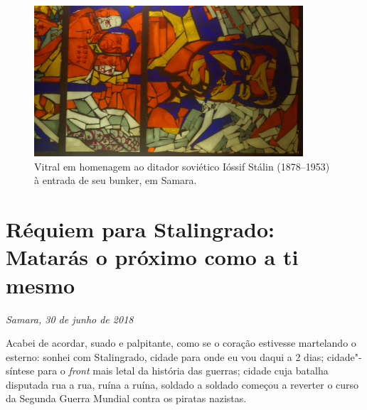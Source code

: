 \movetoevenpage
\begin{absolutelynopagebreak}
\begin{vplace}
\begin{figure}[H]
\begin{adjustwidth}{-2.7cm}{}
  \vspace{-2.5cm}
  \hspace{2.2cm}
  \includegraphics[width=100mm]{./imgs/samara1.jpg}  
\end{adjustwidth}
  \caption{Vitral em homenagem ao ditador soviético Ióssif Stálin (1878--1953) à entrada de seu bunker, em Samara.}

\thispagestyle{empty}

\end{figure}
\end{vplace}

\end{absolutelynopagebreak}

\chapter*{Réquiem para Stalingrado:\\Matarás o próximo como a ti mesmo}
\@openrighttrue\makeatother

\begin{flushright}
\emph{Samara, 30 de junho de 2018}
\end{flushright}

Acabei de acordar, suado e palpitante, como se o coração estivesse
martelando o esterno: sonhei com Stalingrado, cidade para onde eu vou
daqui a 2 dias; cidade"-síntese para o \emph{front} mais letal da
história das guerras; cidade cuja batalha disputada rua a rua, ruína a
ruína, soldado a soldado começou a reverter o curso da Segunda Guerra
Mundial contra os piratas nazistas.

